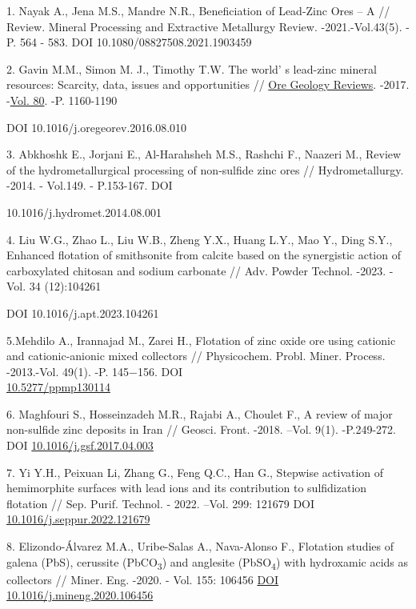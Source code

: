 \begin{references}
1. Nayak A., Jena M.S., Mandre N.R., Beneficiation of Lead-Zinc Ores -- A
// Review. Mineral Processing and Extractive Metallurgy Review.
-2021.-Vol.43(5). -P. 564 - 583. DOI 10.1080/08827508.2021.1903459

2. Gavin M.M., Simon M. J., Timothy T.W. The world' s
lead-zinc mineral resources: Scarcity, data, issues and opportunities
//
\href{https://www.sciencedirect.com/journal/ore-geology-reviews}{Ore
Geology Reviews}. -2017.
-\href{file:///C:/Users/admin/Desktop/Вестник\%20КазУТБ/Vol.\%2080}{Vol.
80}. -P. 1160-1190

DOI 10.1016/j.oregeorev.2016.08.010

3. Abkhoshk E., Jorjani E., Al-Harahsheh M.S., Rashchi F., Naazeri M.,
Review of the hydrometallurgical processing of non-sulfide zinc ores
// Hydrometallurgy. -2014. - Vol.149. - P.153-167. DOI

10.1016/j.hydromet.2014.08.001

4. Liu W.G., Zhao L., Liu W.B., Zheng Y.X., Huang L.Y., Mao Y., Ding
S.Y., Enhanced flotation of smithsonite from calcite based on the
synergistic action of carboxylated chitosan and sodium carbonate //
Adv. Powder Technol. -2023. -Vol. 34 (12):104261

DOI 10.1016/j.apt.2023.104261

5.Mehdilo A., Irannajad M., Zarei H., Flotation of zinc oxide ore using
cationic and cationic-anionic mixed collectors // Physicochem. Probl.
Miner. Process. -2013.-Vol. 49(1). -P. 145−156. DOI\\
\href{http://dx.doi.org/10.5277/ppmp130114}{10.5277/ppmp130114}

6. Maghfouri S., Hosseinzadeh M.R., Rajabi A., Choulet F., A review of
major non-sulfide zinc deposits in Iran // Geosci. Front. -2018. --Vol.
9(1). -P.249-272. DOI
\href{https://doi.org/10.1016/j.gsf.2017.04.003}{10.1016/j.gsf.2017.04.003}

7. Yi Y.H., Peixuan Li, Zhang G., Feng Q.C., Han G., Stepwise activation
of hemimorphite surfaces with lead ions and its contribution to
sulfidization flotation // Sep. Purif. Technol. - 2022. --Vol. 299:
121679 DOI
\href{https://doi.org/10.1016/j.seppur.2022.121679}{10.1016/j.seppur.2022.121679}

8. Elizondo-Álvarez M.A., Uribe-Salas A., Nava-Alonso F., Flotation
studies of galena (PbS), cerussite (PbCO\textsubscript{3}) and anglesite
(PbSO\textsubscript{4}) with hydroxamic acids as collectors // Miner.
Eng. -2020. - Vol. 155: 106456
\href{https://doi.org/10.1016/j.mineng.2020.106456}{DOI
10.1016/j.mineng.2020.106456}


\end{references}
